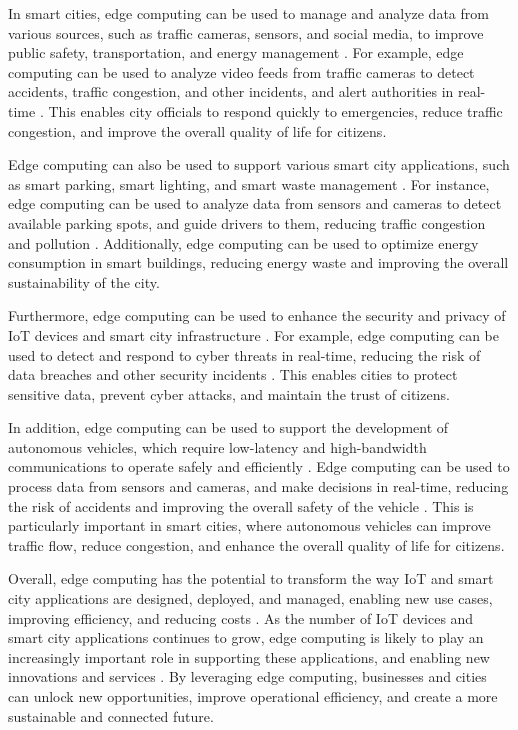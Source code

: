 \documentclass[11pt]{article}
\begin{document}
In smart cities, edge computing can be used to manage and analyze data from various sources, such as traffic cameras, sensors, and social media, to improve public safety, transportation, and energy management \cite{ref18}. For example, edge computing can be used to analyze video feeds from traffic cameras to detect accidents, traffic congestion, and other incidents, and alert authorities in real-time \cite{ref36}. This enables city officials to respond quickly to emergencies, reduce traffic congestion, and improve the overall quality of life for citizens.

Edge computing can also be used to support various smart city applications, such as smart parking, smart lighting, and smart waste management \cite{ref37}. For instance, edge computing can be used to analyze data from sensors and cameras to detect available parking spots, and guide drivers to them, reducing traffic congestion and pollution \cite{ref38}. Additionally, edge computing can be used to optimize energy consumption in smart buildings, reducing energy waste and improving the overall sustainability of the city.

Furthermore, edge computing can be used to enhance the security and privacy of IoT devices and smart city infrastructure \cite{ref39}. For example, edge computing can be used to detect and respond to cyber threats in real-time, reducing the risk of data breaches and other security incidents \cite{ref40}. This enables cities to protect sensitive data, prevent cyber attacks, and maintain the trust of citizens.

In addition, edge computing can be used to support the development of autonomous vehicles, which require low-latency and high-bandwidth communications to operate safely and efficiently \cite{ref41}. Edge computing can be used to process data from sensors and cameras, and make decisions in real-time, reducing the risk of accidents and improving the overall safety of the vehicle \cite{ref42}. This is particularly important in smart cities, where autonomous vehicles can improve traffic flow, reduce congestion, and enhance the overall quality of life for citizens.

Overall, edge computing has the potential to transform the way IoT and smart city applications are designed, deployed, and managed, enabling new use cases, improving efficiency, and reducing costs \cite{ref1}. As the number of IoT devices and smart city applications continues to grow, edge computing is likely to play an increasingly important role in supporting these applications, and enabling new innovations and services \cite{ref43}. By leveraging edge computing, businesses and cities can unlock new opportunities, improve operational efficiency, and create a more sustainable and connected future.
\end{document}
